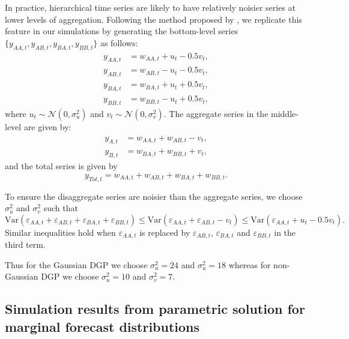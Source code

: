 \documentclass[12pt]{article}
\def\var{\text{Var}}
\theoremstyle{definition}
\begin{document}
In practice, hierarchical time series are likely to have relatively noisier series at lower levels of aggregation. Following the method proposed by \citet{WicEtAl2019}, we replicate this feature in our simulations by generating the bottom-level series $\{y_{AA,t},y_{AB,t},y_{BA,t},y_{BB,t}\}$ as follows:
\begin{align*}
y_{AA,t} &= w_{AA,t} + u_t - 0.5v_t,\\
y_{AB,t} &= w_{AB,t} - u_t - 0.5v_t,\\
y_{BA,t} &= w_{BA,t} + u_t + 0.5v_t,\\
y_{BB,t} &= w_{BB,t} - u_t + 0.5v_t,
\end{align*}
where $u_t \sim \mathcal{N}(0,\sigma^2_u)$ and $v_t \sim \mathcal{N}(0,\sigma^2_v)$. The aggregate series in the middle-level are given by:
\begin{align*}
y_{A,t} &= w_{AA,t} + w_{AB,t} - v_t,\\
y_{B,t} &= w_{BA,t} + w_{BB,t} + v_t,
\end{align*}
and the total series is given by
\[
y_{Tot,t} = w_{AA,t} + w_{AB,t} + w_{BA,t} + w_{BB,t}.
\]


To ensure the disaggregate series are noisier than the aggregate series, we choose $\sigma^2_u$ and $\sigma^2_v$ such that
\[
\var(\varepsilon_{AA,t} + \varepsilon_{AB,t} + \varepsilon_{BA,t} + \varepsilon_{BB,t})
\le \var(\varepsilon_{AA,t}+\varepsilon_{AB,t}-v_t)
\le \var(\varepsilon_{AA,t}+u_t-0.5v_t).
\]
Similar inequalities hold when $\varepsilon_{AA,t}$ is replaced by $\varepsilon_{AB,t}$, $\varepsilon_{BA,t}$ and $\varepsilon_{BB,t}$ in the third term.

Thus for the Gaussian DGP we choose $\sigma^2_u = 24$ and $\sigma^2_u = 18$ whereas for non-Gaussian DGP we choose $\sigma^2_u = 10$ and $\sigma^2_v = 7$.

\subsection{Simulation results from parametric solution for marginal forecast distributions}\label{Append:Gauss_sim_Univ}
\end{document}
